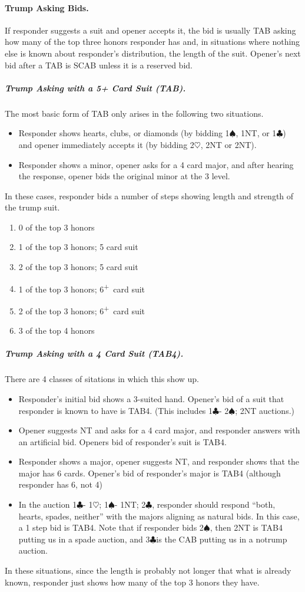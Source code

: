 \documentclass[10pt]{article}
\renewcommand{\c}{$\clubsuit$}
\newcommand{\h}{$\heartsuit$}
\newcommand{\s}{$\spadesuit$}
\newcommand{\p}{\textsuperscript{+}}
\begin{document}
\begin{multicols*}{2}
\paragraph{Trump Asking Bids.}

If responder suggests a suit and opener accepts it, the bid is usually TAB
asking how many of the top three honors responder has and, in situations where
nothing else is known about responder’s distribution, the length of the suit.
Opener’s next bid after a TAB is SCAB unless it is a reserved bid.

\subparagraph{Trump Asking with a 5+ Card Suit (TAB).}

The most basic form of TAB only arises in the following two situations.
\begin{itemize}
\item Responder shows hearts, clubs, or diamonds (by bidding 1\s, 1NT, or 1\c) and
  opener immediately accepts it (by bidding 2\h, 2NT or 2NT).
\item Responder shows a minor, opener asks for a 4 card major, and after hearing
  the response, opener bids the original minor at the 3 level.
\end{itemize}
In these cases, responder bids a number of steps showing length and strength of the trump suit.
\begin{enumerate}
\item 0 of the top 3 honors
\item 1 of the top 3 honors; 5 card suit
\item 2 of the top 3 honors; 5 card suit
\item 1 of the top 3 honors; 6\p\ card suit
\item 2 of the top 3 honors; 6\p\ card suit
\item 3 of the top 4 honors
\end{enumerate}

\subparagraph{Trump Asking with a 4 Card Suit (TAB4).}

 There are 4 classes of sitations
in which this show up.
\begin{itemize}
\item Responder’s initial bid shows a 3-suited hand. Opener’s bid of a suit
  that responder is known to have is TAB4. (This includes 1\c - 2\s; 2NT
  auctions.)
\item Opener suggests NT and asks for a 4 card major, and responder answers
  with an artificial bid. Openers bid of responder’s suit is TAB4.
\item Responder shows a major, opener suggests NT, and responder shows that
  the major has 6 cards. Opener’s bid of responder’s major is TAB4 (although
  responder has 6, not 4)
\item In the auction 1\c - 1\h; 1\s - 1NT; 2\c, responder should respond “both,
  hearts, spades, neither” with the majors aligning as natural bids. In this
  case, a 1 step bid is TAB4. Note that if responder bids 2\s, then 2NT is TAB4
  putting us in a spade auction, and 3\c is the CAB putting us in a notrump
  auction.
\end{itemize}
In these situations, since the length is probably not longer that what is already
known, responder just shows how many of the top 3 honors they have.


\end{multicols*}
\end{document}
